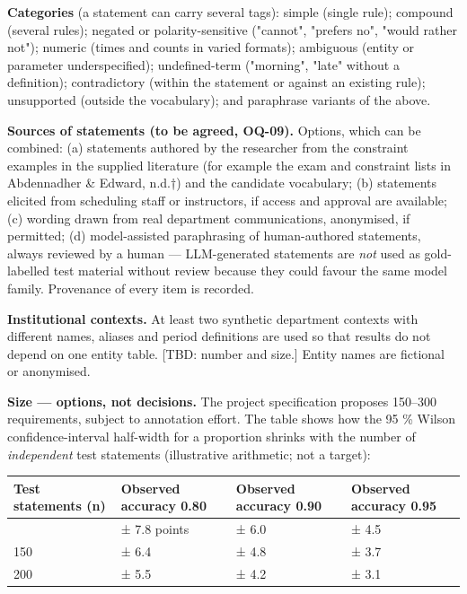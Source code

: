 \documentclass[
  11pt,a4paper,oneside]{report}
\begin{document}
\textbf{Categories} (a statement can carry several tags): simple (single
rule); compound (several rules); negated or polarity-sensitive
("cannot", "prefers no", "would rather not"); numeric (times and counts
in varied formats); ambiguous (entity or parameter underspecified);
undefined-term ("morning", "late" without a definition); contradictory
(within the statement or against an existing rule); unsupported (outside
the vocabulary); and paraphrase variants of the above.

\textbf{Sources of statements (to be agreed, OQ-09).} Options, which can
be combined: (a) statements authored by the researcher from the
constraint examples in the supplied literature (for example the exam and
constraint lists in Abdennadher \& Edward, n.d.†) and the candidate vocabulary; (b) statements elicited
from scheduling staff or instructors, if access and approval are
available; (c) wording drawn from real department communications,
anonymised, if permitted; (d) model-assisted paraphrasing of
human-authored statements, always reviewed by a human --- LLM-generated
statements are \emph{not} used as gold-labelled test material without
review because they could favour the same model family. Provenance of
every item is recorded.

\textbf{Institutional contexts.} At least two synthetic department
contexts with different names, aliases and period definitions are used
so that results do not depend on one entity table. {[}TBD: number and
size.{]} Entity names are fictional or anonymised.

\textbf{Size --- options, not decisions.} The project specification
proposes 150--300 requirements, subject to annotation effort. The table
shows how the 95 \% Wilson confidence-interval half-width for a
proportion shrinks with the number of \emph{independent} test statements
(illustrative arithmetic; not a target):

\begin{longtable}[]{@{}p{\dimexpr(\linewidth-8\tabcolsep)/4\relax}p{\dimexpr(\linewidth-8\tabcolsep)/4\relax}p{\dimexpr(\linewidth-8\tabcolsep)/4\relax}p{\dimexpr(\linewidth-8\tabcolsep)/4\relax}@{}}
\toprule\noalign{}
Test statements (n) & Observed accuracy 0.80 & Observed accuracy 0.90 &
Observed accuracy 0.95 \\
\midrule\noalign{}
\endhead
\bottomrule\noalign{}
\endlastfoot
100 & ± 7.8 points & ± 6.0 & ± 4.5 \\
150 & ± 6.4 & ± 4.8 & ± 3.7 \\
200 & ± 5.5 & ± 4.2 & ± 3.1 \\
\end{longtable}
\end{document}
